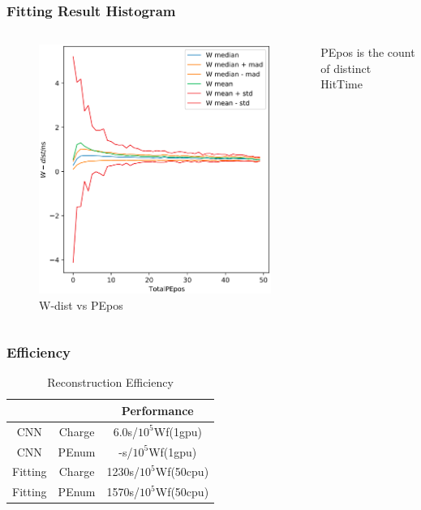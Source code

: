 \documentclass{beamer}
\begin{document}
\begin{frame}
\frametitle{Fitting Result Histogram}
\setlength{\abovecaptionskip}{0mm}
\setlength{\belowcaptionskip}{0mm}
\begin{columns}
\begin{figure}
    \centering
    \caption{W-dist vs PEpos}
    \includegraphics[width=0.9\linewidth]{img/xiaopeipstats.png}
\end{figure}
PEpos is the count of distinct HitTime
\end{columns}
\end{frame}

\begin{frame}
\frametitle{Efficiency}
\begin{table}
    \centering
    \caption{Reconstruction Efficiency}
    \begin{tabular}{c|c|c}
        \hline
        &  & Performance \\
        \hline
        CNN & Charge & 6.0s/$10^{5}$Wf(1gpu) \\
        \hline
        CNN & PEnum & -s/$10^{5}$Wf(1gpu)\\
        \hline
        Fitting & Charge & 1230s/$10^{5}$Wf(50cpu) \\
        \hline
        Fitting & PEnum & 1570s/$10^{5}$Wf(50cpu) \\
        \hline
    \end{tabular}
\end{table}
\end{frame}
\end{document}
